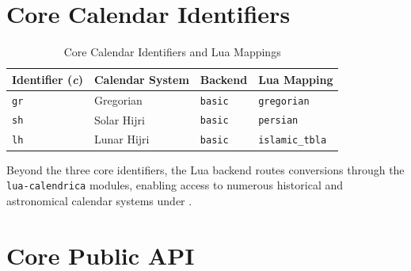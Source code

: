 \documentclass[10pt]{article}
\newcommand{\LuaLaTeXLogo}{\hologo{LuaLaTeX}}
\begin{document}
        \section{Core Calendar Identifiers}
   \begin{table}[h!]
       \caption{Core Calendar Identifiers and Lua Mappings}
       \label{tab:core-calendars}
       \vspace{2pt}
       \centering\small
       \begin{tabular}{llll}
           \toprule
           \textbf{Identifier (\textit{c})} &
           \textbf{Calendar System} &
           \textbf{Backend} &
           \textbf{Lua Mapping} \\
           \midrule
           
           \texttt{gr} &
           Gregorian &
           \texttt{basic} &
           \texttt{gregorian} \\
           
           \texttt{sh} &
           Solar Hijri &
           \texttt{basic} &
           \texttt{persian} \\
           
           \texttt{lh} &
           Lunar Hijri &
           \texttt{basic} &
           \texttt{islamic\_tbla} \\
           
           \bottomrule
       \end{tabular}
   \end{table}
   
    
   Beyond the three core identifiers, the Lua backend routes conversions through
   the \texttt{lua-calendrica} modules, enabling access to numerous historical and
   astronomical calendar systems under \LuaLaTeXLogo{}.
   
    
    
    
    \section{Core Public API}
    
\end{document}
